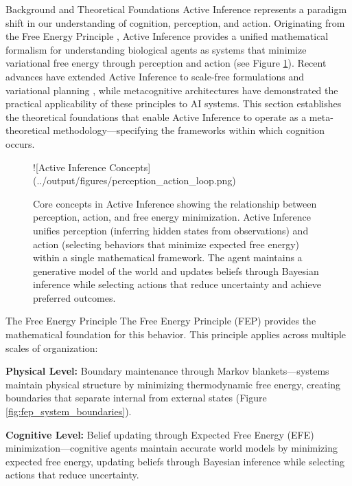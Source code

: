 \documentclass[
  ignorenonframetext,
]{beamer}
\author{\texorpdfstring{}{}}
\date{}
\begin{document}
\begin{frame}{Background and Theoretical Foundations}
\protect{}\label{sec:background}
Active Inference represents a paradigm shift in our understanding of
cognition, perception, and action. Originating from the Free Energy
Principle \cite{friston2010free}, Active Inference provides a unified
mathematical formalism for understanding biological agents as systems
that minimize variational free energy through perception and action (see
Figure \ref{fig:active_inference_concepts}). Recent advances have
extended Active Inference to scale-free formulations
\cite{friston2025scalefree} and variational planning
\cite{champion2025efeplanning}, while metacognitive architectures
\cite{metamind2025, sofai2025} have demonstrated the practical
applicability of these principles to AI systems. This section
establishes the theoretical foundations that enable Active Inference to
operate as a meta-theoretical methodology---specifying the frameworks
within which cognition occurs.

\begin{figure}[h]
\centering
![Active Inference Concepts](../output/figures/perception_action_loop.png)
\caption{Core concepts in Active Inference showing the relationship between perception, action, and free energy minimization. Active Inference unifies perception (inferring hidden states from observations) and action (selecting behaviors that minimize expected free energy) within a single mathematical framework. The agent maintains a generative model of the world and updates beliefs through Bayesian inference while selecting actions that reduce uncertainty and achieve preferred outcomes.}
\label{fig:active_inference_concepts}
\end{figure}

\begin{block}{The Free Energy Principle}
\protect{}\label{the-free-energy-principle}
The Free Energy Principle (FEP) provides the mathematical foundation for
this behavior. This principle applies across multiple scales of
organization:

\textbf{Physical Level:} Boundary maintenance through Markov
blankets---systems maintain physical structure by minimizing
thermodynamic free energy, creating boundaries that separate internal
from external states (Figure \ref{fig:fep_system_boundaries}).

\textbf{Cognitive Level:} Belief updating through Expected Free Energy
(EFE) minimization---cognitive agents maintain accurate world models by
minimizing expected free energy, updating beliefs through Bayesian
inference while selecting actions that reduce uncertainty.


\end{block}
\end{frame}
\end{document}
